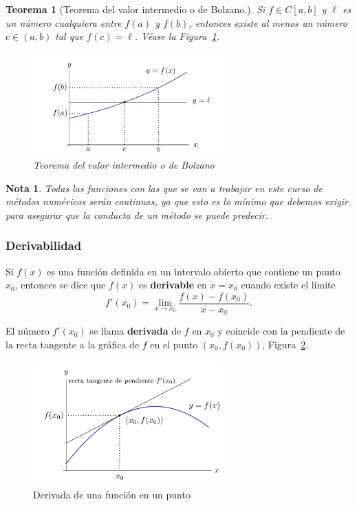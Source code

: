 \documentclass[12pt]{article}
\newtheorem{Note}{Nota}%
\newtheorem{Teo}{Teorema}
\begin{document}
\begin{Teo}[Teorema del valor intermedio o de Bolzano.]
Si $f \in C[a, b] $ y $\ell $ es un número cualquiera entre $f(a) $ y $f(b) $, entonces existe al menos un número $c \in (a, b) $ tal que $f(c) = \ell $. Véase la Figura~\ref{fig:bolzano}.

\begin{figure}[H]
\centering
\includegraphics[width=0.65\textwidth]{Fig1.png}
\caption{Teorema del valor intermedio o de Bolzano}
\label{fig:bolzano}
\end{figure}
\end{Teo}


\begin{Note}
Todas las funciones con las que se van a trabajar en este curso de métodos numéricos serán continuas, ya que esto es lo mínimo que debemos exigir para asegurar que la conducta de un método se puede predecir.
\end{Note}

\subsubsection{Derivabilidad}

Si $f(x) $ es una función definida en un intervalo abierto que contiene un punto $x_0 $, entonces se dice que $f(x) $ es \textbf{derivable} en $x = x_0 $ cuando existe el límite
$$f'(x_0) = \lim_{x \to x_0} \frac{f(x) - f(x_0)}{x - x_0}.$$

El número $f'(x_0)$ se llama \textbf{derivada} de $f$ en $x_0$ y coincide con la pendiente de la recta tangente a la gráfica de $f$ en el punto $(x_0, f(x_0))$, Figura~\ref{fig:derivada}.

\begin{figure}[H]
\centering
\includegraphics[width=0.65\textwidth]{Fig2.png}
\caption{Derivada de una función en un punto}
\label{fig:derivada}
\end{figure}
\end{document}
